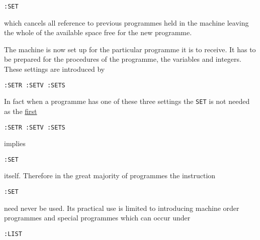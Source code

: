 \documentclass[10pt, a4paper, oneside]{article}
\newcommand{\myuline}[1]{\uline{#1}}
\newcommand{\mytt}[1]{\texttt{\scriptsize #1}}
\newcommand{\mytt}[1]{\texttt{\small #1}}
\begin{document}
\begin{multicols}{2}
\begin{addmargin}[1cm]{1em}%
\begin{lstlisting}
:SET
\end{lstlisting}
\end{addmargin}

which cancels all reference
to previous programmes held in the machine leaving the
whole of the available space free for the new programme.

The machine is now set up for the particular
programme it is to receive.  It has to be prepared
for the procedures of the programme, the variables
and integers.  These settings are introduced by

\begin{addmargin}[1cm]{1em}%
\begin{lstlisting}
:SETR :SETV :SETS
\end{lstlisting}
\end{addmargin}

In fact when a programme has one of
these three settings the \mytt{SET} is not needed as the
\myuline{first}

\begin{addmargin}[1cm]{1em}%
\begin{lstlisting}
:SETR :SETV :SETS
\end{lstlisting}
\end{addmargin}

implies

\begin{addmargin}[1cm]{1em}%
\begin{lstlisting}
:SET
\end{lstlisting}
\end{addmargin}

itself.  Therefore
in the great majority of programmes the instruction

\begin{addmargin}[1cm]{1em}%
\begin{lstlisting}
:SET
\end{lstlisting}
\end{addmargin}

need never be used.  Its practical use is limited
to introducing machine order programmes and special
programmes which can occur under

\begin{addmargin}[1cm]{1em}%
\begin{lstlisting}
:LIST
\end{lstlisting}
\end{addmargin}


\end{multicols}
\end{document}
